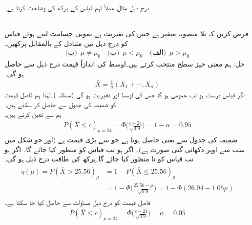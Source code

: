 درج ذیل مثال عملاً اہم قیاس کے پرکھ کی وضاحت کرتا ہے۔ 

\quad {}\\
فرض کریں کہ  بلا منصوبہ متغیر ہے جس کی تغیریت  ہے۔نمونی جسامت  لیتے ہوئے قیاس  کو درج ذیل تین متبادل کے بالمقابل پرکھیں۔
\begin{align*}
\text{(پ)}\,\,\, \mu \ne \mu_0 \quad \text{(ب)}\,\,\, \mu<\mu_0 \quad \text{(الف)}\,\,\,  \mu>\mu_0
\end{align*}
حل:\quad
ہم معنی خیز سطح  منتخب کرتے ہیں۔اوسط کی اندازاً قیمت درج ذیل سے حاصل ہو گی۔
\begin{align*}
\overline{X}=\frac{1}{n}(X_1+\cdots,X_n)
\end{align*}
اگر قیاس درست ہو تب  عمومی ہو گا جس کی اوسط  اور تغیریت  ہو گی (مسئلہ )۔لہٰذا ہم فاصل قیمت  کو ضمیمہ  کی جدول  سے حاصل کر سکتے ہیں۔\\
\quad
ہم  سے  تعین کرتے ہیں۔
\begin{align*}
P(\overline{X}\le c)_{\mu=24}=\Phi\big(\frac{c-24}{\sqrt{0.9}}\big)=1-\alpha=0.95
\end{align*}
ضمیمہ  کی جدول   سے  یعنی  حاصل ہوتا ہے جو  سے بڑی قیمت ہے (اور جو شکل  میں سب سے اوپر دکھائی گئی صورت ہے)۔ اگر  ہو تب قیاس کو منظور کیا جائے گا۔ اگر  ہو تب قیاس کو نا منظور کیا جائے گا۔پرکھ کی طاقت درج ذیل ہو گی۔
\begin{gather}
\begin{aligned}
\eta(\mu)=P(\overline{X}>25.56)_{\mu}&=1-P(\overline{X}\le 25.56)_{\mu}\\
&=1-\Phi\big(\frac{25.56-\mu}{\sqrt{0.9}}\big)=1-\Phi(26.94-1.05\mu)
\end{aligned}
\end{gather}
\quad
فاصل قیمت  کو درج ذیل مساوات سے حاصل کیا جا سکتا ہے۔
\begin{align*}
P(\overline{X}\le c)_{\mu=24}=\Phi\big(\frac{c-24}{\sqrt{0.9}}\big)=\alpha=0.05
\end{align*}
